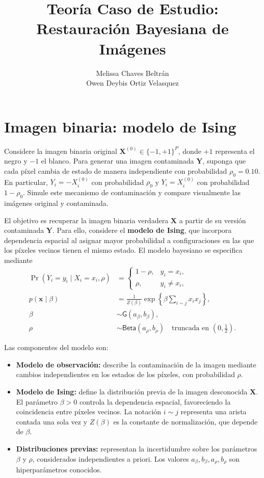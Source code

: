 \documentclass[11pt,a4paper]{article}
\title{Teoría Caso de Estudio: Restauración Bayesiana de Imágenes}
\author{Melissa Chaves Beltrán \\ Owen Deybis Ortiz Velasquez}
\date{}
\begin{document}
\maketitle

\section{Imagen binaria: modelo de Ising}

Considere la imagen binaria original $\boldsymbol{X}^{(0)} \in \{-1,+1\}^P$, donde $+1$ representa el negro y $-1$ el blanco. Para generar una imagen contaminada $\boldsymbol{Y}$, suponga que cada píxel cambia de estado de manera independiente con probabilidad $\rho_0 = 0.10$. En particular, $Y_i = -X_i^{(0)}$ con probabilidad $\rho_0$ y $Y_i = X_i^{(0)}$ con probabilidad $1-\rho_0$. Simule este mecanismo de contaminación y compare visualmente las imágenes original y contaminada.

El objetivo es recuperar la imagen binaria verdadera $\boldsymbol{X}$ a partir de su versión contaminada $\boldsymbol{Y}$. Para ello, considere el \textbf{modelo de Ising}, que incorpora dependencia espacial al asignar mayor probabilidad a configuraciones en las que los píxeles vecinos tienen el mismo estado. El modelo bayesiano se especifica mediante
\begin{align*}
\Pr(Y_i = y_i \mid X_i = x_i, \rho) &= \begin{cases} 1 - \rho, & y_i = x_i, \\ \rho, & y_i \neq x_i, \end{cases} \\[6pt]
p(\boldsymbol{x} \mid \beta) &= \frac{1}{Z(\beta)} \exp\left\{ \beta \sum_{i \sim j} x_i x_j \right\}, \\[6pt]
\beta &\sim \textsf{G}(a_\beta, b_\beta), \\
\rho &\sim \textsf{Beta}(a_\rho, b_\rho) \quad \text{truncada en } \left(0, \tfrac{1}{2}\right).
\end{align*}

Las componentes del modelo son:
\begin{itemize}
    \item \textbf{Modelo de observación:} describe la contaminación de la imagen mediante cambios independientes en los estados de los píxeles, con probabilidad $\rho$.
    \item \textbf{Modelo de Ising:} define la distribución previa de la imagen desconocida $\boldsymbol{X}$. El parámetro $\beta > 0$ controla la dependencia espacial, favoreciendo la coincidencia entre píxeles vecinos. La notación $i \sim j$ representa una arista contada una sola vez y $Z(\beta)$ es la constante de normalización, que depende de $\beta$.
    \item \textbf{Distribuciones previas:} representan la incertidumbre sobre los parámetros $\beta$ y $\rho$, considerados independientes a priori. Los valores $a_\beta, b_\beta, a_\rho, b_\rho$ son hiperparámetros conocidos.
\end{itemize}
\end{document}
